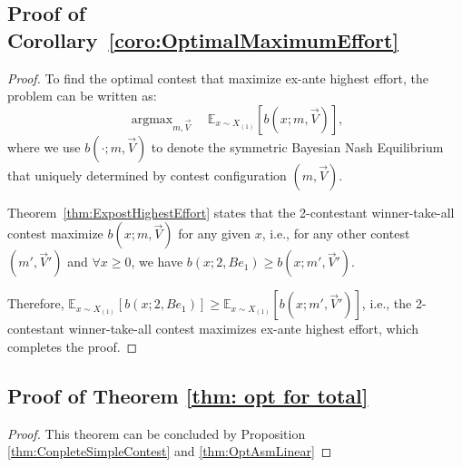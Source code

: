 \subsection*{Proof of Corollary~\ref{coro:OptimalMaximumEffort}}
\begin{proof}
    To find the optimal contest that maximize ex-ante highest effort, the problem can be written as:
    \[
    \mathop{\arg \max}_{m,\vec{V}} \quad\mathbb{E}_{x \sim X_{(1)}}[b(x;m,\vec{V})],
    \]
    where we use $b(\cdot;m,\vec{V})$ to denote the symmetric Bayesian Nash Equilibrium that uniquely determined by contest configuration $(m,\vec{V})$. 

    Theorem~\ref{thm:ExpostHighestEffort} states that the 2-contestant winner-take-all contest maximize $b(x;m,\vec{V})$ for any given $x$, i.e., for any other contest $(m', \vec{V}')$ and $\forall x\geq0$, we have $b(x;2,Be_1) \geq b(x;m',\vec{V}')$. 

    Therefore, $\mathbb{E}_{x\sim X_{(1)}}[b(x;2,Be_1)]\geq \mathbb{E}_{x\sim X_{(1)}}[b(x;m',\vec{V}')]$, i.e., the 2-contestant winner-take-all contest maximizes ex-ante highest effort, which completes the proof.
\end{proof}

\subsection*{Proof of Theorem \ref{thm: opt for total}}
\begin{proof}
    This theorem can be concluded by Proposition \ref{thm:ConpleteSimpleContest} and \ref{thm:OptAsmLinear}
\end{proof}

